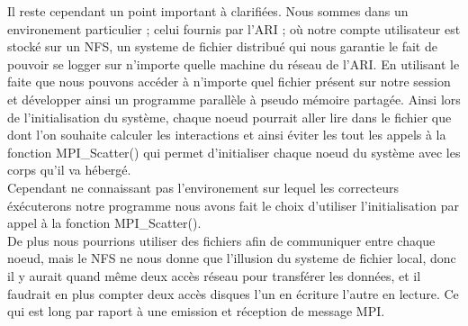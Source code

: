 \par Il reste cependant un point important à clarifiées. Nous sommes dans un environement particulier ; 
celui fournis par l'ARI ; où notre compte utilisateur est stocké sur un NFS, un systeme de fichier 
distribué qui nous garantie le fait de pouvoir se logger sur n'importe quelle machine du réseau 
de l'ARI. En utilisant le faite que nous pouvons accéder à n'importe quel fichier présent sur 
notre session et développer ainsi un programme parallèle à pseudo mémoire partagée.
Ainsi lors de l'initialisation du système, chaque noeud  pourrait aller lire dans le fichier 
que dont l'on souhaite calculer les interactions et ainsi éviter les tout les appels à la fonction 
MPI\_Scatter() qui permet d'initialiser chaque noeud du système avec les corps qu'il va hébergé.\\
Cependant ne connaissant pas l'environement sur lequel les correcteurs éxécuterons notre 
programme nous avons fait le choix d'utiliser l'initialisation par appel à la fonction MPI\_Scatter().\\
De plus nous pourrions utiliser des fichiers afin de communiquer entre chaque noeud, mais le NFS ne nous
donne que l'illusion du systeme de fichier local, donc il y aurait quand même deux accès réseau pour 
transférer les données, et il faudrait en plus compter deux accès disques l'un en écriture l'autre en lecture.
Ce qui est long par raport à une emission et réception de message MPI.\\
